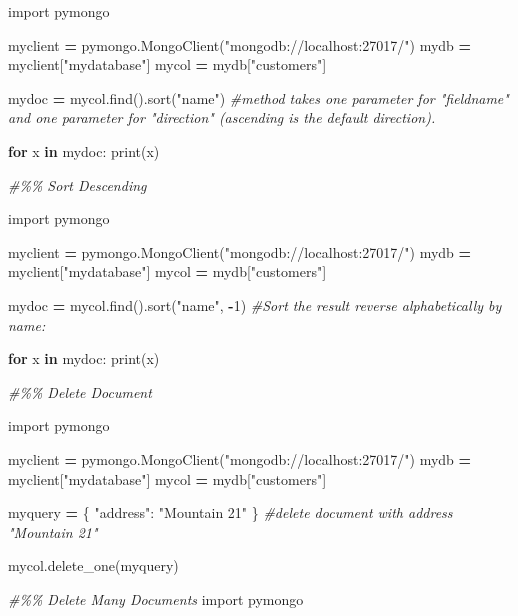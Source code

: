 \documentclass[
]{book}
\newenvironment{Shaded}{\begin{snugshade}}{\end{snugshade}}
\newcommand{\BuiltInTok}[1]{#1}
\newcommand{\CommentTok}[1]{\textcolor[rgb]{0.56,0.35,0.01}{\textit{#1}}}
\newcommand{\ControlFlowTok}[1]{\textcolor[rgb]{0.13,0.29,0.53}{\textbf{#1}}}
\newcommand{\DecValTok}[1]{\textcolor[rgb]{0.00,0.00,0.81}{#1}}
\newcommand{\ImportTok}[1]{#1}
\newcommand{\KeywordTok}[1]{\textcolor[rgb]{0.13,0.29,0.53}{\textbf{#1}}}
\newcommand{\NormalTok}[1]{#1}
\newcommand{\OperatorTok}[1]{\textcolor[rgb]{0.81,0.36,0.00}{\textbf{#1}}}
\newcommand{\StringTok}[1]{\textcolor[rgb]{0.31,0.60,0.02}{#1}}
\begin{document}
\begin{Shaded}
\begin{Highlighting}[]
\ImportTok{import}\NormalTok{ pymongo}

\NormalTok{myclient }\OperatorTok{=}\NormalTok{ pymongo.MongoClient(}\StringTok{"mongodb://localhost:27017/"}\NormalTok{)}
\NormalTok{mydb }\OperatorTok{=}\NormalTok{ myclient[}\StringTok{"mydatabase"}\NormalTok{]}
\NormalTok{mycol }\OperatorTok{=}\NormalTok{ mydb[}\StringTok{"customers"}\NormalTok{]}

\NormalTok{mydoc }\OperatorTok{=}\NormalTok{ mycol.find().sort(}\StringTok{"name"}\NormalTok{) }\CommentTok{\#method takes one parameter for "fieldname" and one parameter for "direction" (ascending is the default direction).}

\ControlFlowTok{for}\NormalTok{ x }\KeywordTok{in}\NormalTok{ mydoc:}
  \BuiltInTok{print}\NormalTok{(x)}

\CommentTok{\#\%\% Sort Descending}
  
\ImportTok{import}\NormalTok{ pymongo}

\NormalTok{myclient }\OperatorTok{=}\NormalTok{ pymongo.MongoClient(}\StringTok{"mongodb://localhost:27017/"}\NormalTok{)}
\NormalTok{mydb }\OperatorTok{=}\NormalTok{ myclient[}\StringTok{"mydatabase"}\NormalTok{]}
\NormalTok{mycol }\OperatorTok{=}\NormalTok{ mydb[}\StringTok{"customers"}\NormalTok{]}

\NormalTok{mydoc }\OperatorTok{=}\NormalTok{ mycol.find().sort(}\StringTok{"name"}\NormalTok{, }\OperatorTok{{-}}\DecValTok{1}\NormalTok{) }\CommentTok{\#Sort the result reverse alphabetically by name:}

\ControlFlowTok{for}\NormalTok{ x }\KeywordTok{in}\NormalTok{ mydoc:}
  \BuiltInTok{print}\NormalTok{(x)}

\CommentTok{\#\%\% Delete Document}

\ImportTok{import}\NormalTok{ pymongo}

\NormalTok{myclient }\OperatorTok{=}\NormalTok{ pymongo.MongoClient(}\StringTok{"mongodb://localhost:27017/"}\NormalTok{)}
\NormalTok{mydb }\OperatorTok{=}\NormalTok{ myclient[}\StringTok{"mydatabase"}\NormalTok{]}
\NormalTok{mycol }\OperatorTok{=}\NormalTok{ mydb[}\StringTok{"customers"}\NormalTok{]}

\NormalTok{myquery }\OperatorTok{=}\NormalTok{ \{ }\StringTok{"address"}\NormalTok{: }\StringTok{"Mountain 21"}\NormalTok{ \} }\CommentTok{\#delete document with address "Mountain 21"}

\NormalTok{mycol.delete\_one(myquery)}

\CommentTok{\#\%\% Delete Many Documents}
\ImportTok{import}\NormalTok{ pymongo}


\end{Highlighting}
\end{Shaded}
\end{document}
